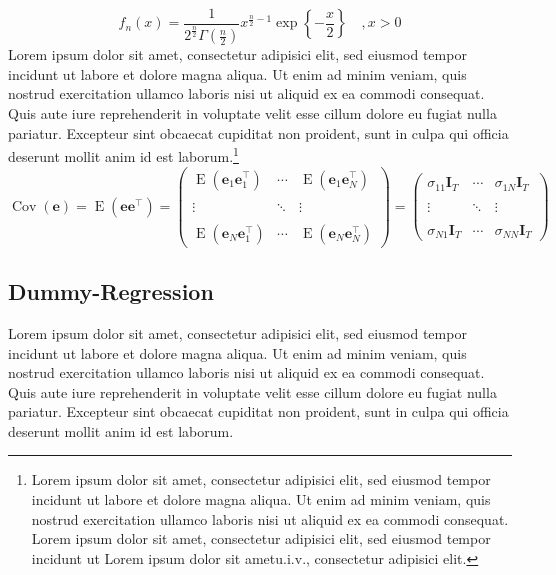 \documentclass[12pt, a4paper, oneside]{article}
\begin{document}
%
\begin{equation}
f_n(x) =  \frac{1}{2^{\frac{n}{2}}\Gamma(\tfrac{n}{2})} x^{\frac{n}{2}-1}\operatorname{exp}\left\{ -\frac x2\right\} \quad, x > 0 
 \end{equation} 
%
Lorem ipsum dolor sit amet, consectetur adipisici elit, sed eiusmod tempor incidunt ut labore et dolore magna aliqua. Ut enim ad minim veniam, quis nostrud exercitation ullamco laboris nisi ut aliquid ex ea commodi consequat. Quis aute iure reprehenderit in voluptate velit esse cillum dolore eu fugiat nulla pariatur. Excepteur sint obcaecat cupiditat non proident, sunt in culpa qui officia deserunt mollit anim id est laborum.\footnote{Lorem ipsum dolor sit amet, consectetur adipisici elit, sed eiusmod tempor incidunt ut labore et dolore magna aliqua. Ut enim ad minim veniam, quis nostrud exercitation ullamco laboris nisi ut aliquid ex ea commodi consequat.\hspace*{5mm} Lorem ipsum dolor sit amet, consectetur adipisici elit, sed eiusmod tempor incidunt ut \hspace*{5mm} Lorem ipsum dolor sit amet\ac{u.i.v.}, consectetur adipisici elit.}
 \begin{equation*}
\operatorname{Cov}(\mathbf e)=\operatorname{E}(\mathbf e \mathbf e^{\top})
= \begin{pmatrix}
 \operatorname{E}(\boldsymbol e_1 \boldsymbol e_1^{\top}) & \cdots & \operatorname{E}(\boldsymbol e_1 \boldsymbol e_N^{\top}) \\ \\
 \vdots & \ddots &  \vdots \\ \\
 \operatorname{E}(\boldsymbol e_N \boldsymbol e_1^{\top}) & \cdots & \operatorname{E}(\boldsymbol e_N \boldsymbol e_N^{\top})
\end{pmatrix}= \begin{pmatrix}
 \sigma_{11}\mathbf I_T  & \cdots &\sigma_{1N}\mathbf I_T  \\ \\
 \vdots & \ddots & \vdots   \\ \\
\sigma_{N1}\mathbf I_T  & \cdots &\sigma_{NN}\mathbf I_T
\end{pmatrix}
\end{equation*}

\subsection{Dummy-Regression}
Lorem ipsum dolor sit amet, consectetur adipisici elit, sed eiusmod tempor incidunt ut labore et dolore magna aliqua. Ut enim ad minim veniam, quis nostrud exercitation ullamco laboris nisi ut aliquid ex ea commodi consequat. Quis aute iure reprehenderit in voluptate velit esse cillum dolore eu fugiat nulla pariatur. Excepteur sint obcaecat cupiditat non proident, sunt in culpa qui officia deserunt mollit anim id est laborum.
\end{document}
